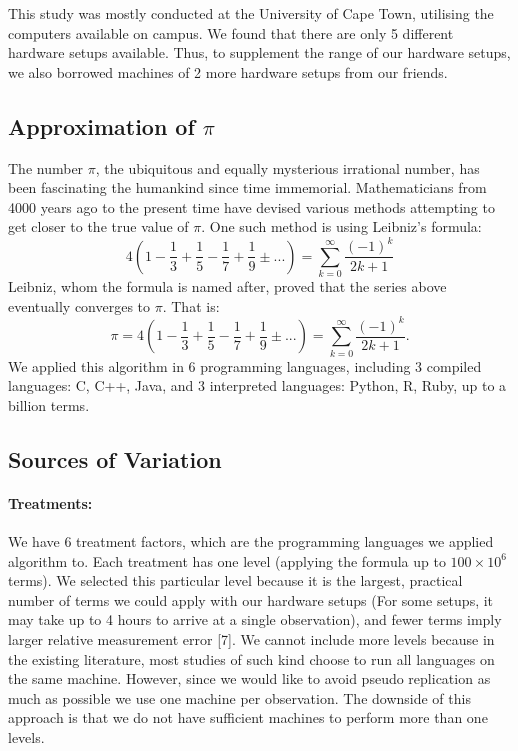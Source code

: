 \documentclass[12pt,halfline,a4paper,]{ouparticle}
\begin{document}
This study was mostly conducted at the University of Cape Town,
utilising the computers available on campus. We found that there are
only 5 different hardware setups available. Thus, to supplement the
range of our hardware setups, we also borrowed machines of 2 more
hardware setups from our friends.

\hypertarget{approximation-of-pi}{%
\subsection{\texorpdfstring{Approximation of
\(\pi\)}{Approximation of \textbackslash pi}}\label{approximation-of-pi}}

The number \(\pi\), the ubiquitous and equally mysterious irrational
number, has been fascinating the humankind since time immemorial.
Mathematicians from 4000 years ago to the present time have devised
various methods attempting to get closer to the true value of \(\pi\).
One such method is using Leibniz's formula: \[
4 \left( 1 - \frac{1}{3} + \frac{1}{5} - \frac{1}{7} + \frac{1}{9} ±... \right) = \sum_{k=0}^{\infty}\frac{(-1)^k}{2k+1}
\] Leibniz, whom the formula is named after, proved that the series
above eventually converges to \(\pi\). That is: \[
\pi = 4 \left( 1 - \frac{1}{3} + \frac{1}{5} - \frac{1}{7} + \frac{1}{9} ±... \right) = \sum_{k=0}^{\infty}\frac{(-1)^k}{2k+1}.
\] We applied this algorithm in 6 programming languages, including 3
compiled languages: C, C++, Java, and 3 interpreted languages: Python,
R, Ruby, up to a billion terms.

\hypertarget{sources-of-variation}{%
\subsection{Sources of Variation}\label{sources-of-variation}}

\hypertarget{treatments}{%
\paragraph{Treatments:}\label{treatments}}

We have 6 treatment factors, which are the programming languages we
applied algorithm to. Each treatment has one level (applying the formula
up to \(100 \times 10^6\) terms). We selected this particular level
because it is the largest, practical number of terms we could apply with
our hardware setups (For some setups, it may take up to 4 hours to
arrive at a single observation), and fewer terms imply larger relative
measurement error {[}7{]}. We cannot include more levels because in the
existing literature, most studies of such kind choose to run all
languages on the same machine. However, since we would like to avoid
pseudo replication as much as possible we use one machine per
observation. The downside of this approach is that we do not have
sufficient machines to perform more than one levels.
\end{document}
